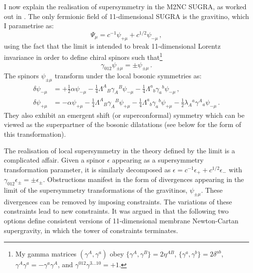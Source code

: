 \documentclass[11pt]{article}
\newcommand{\be}{\begin{equation}}
\newcommand{\ee}{\end{equation}}
\numberwithin{equation}{section}
\begin{document}
{{I now explain the realisation of supersymmetry in the M2NC SUGRA, as worked out in \cite{Bergshoeff:2024nin}.
The only fermionic field of 11-dimensional SUGRA is the gravitino, which I parametrise as:
\be
\Psi_\mu = c^{-1} \psi_{+\mu} + c^{1/2} \psi_{-\mu} \,, 
\label{ExpFer}
\ee
using the fact that the limit is intended to break 11-dimensional Lorentz invariance in order to define chiral spinors such that\footnote{My gamma matrices $(\gamma^A, \gamma^a)$ obey $\{\gamma^A, \gamma^B\} = 2 \eta^{AB}$, $\{\gamma^a, \gamma^b\} = 2 \delta^{ab}$, $\gamma^A \gamma^a = - \gamma^a\gamma^A$, and $\gamma^{012} \gamma^{3\dots10} = +1$.}
\be
\gamma_{012} \psi_{\pm \mu} = \pm \psi_{\pm \mu} \,.
\ee
The spinors $\psi_{\pm \mu}$ transform under the local bosonic symmetries as:
\begin{subequations}
\begin{align}
\label{bosonictransf_ferminus}
\delta \psi_{-\mu}& = + \tfrac12 \alpha \psi_{-\mu}- \tfrac14 \Lambda^A{}_B \gamma_A{}^B \psi_{-\mu} - \tfrac14 \Lambda^a{}_b \gamma_a{}^b \psi_{-\mu}\,,\\
\delta \psi_{+\mu}& = - \alpha \psi_{+\mu} - \tfrac14 \Lambda^A{}_B \gamma_A{}^B \psi_{+\mu} - \tfrac14 \Lambda^a{}_b \gamma_a{}^b \psi_{+\mu}- \tfrac12 \lambda_A{}^a \gamma^A{}_a \psi_{-\mu}  \,.
\label{bosonictransf_ferplus}
\end{align}
\end{subequations}
They also exhibit an emergent shift (or superconformal) symmetry which can be viewed as the superpartner of the bosonic dilatations (see below for the form of this transformation).

The realisation of local supersymmetry in the theory defined by the limit is a complicated affair.
Given a spinor $\epsilon$ appearing as a supersymmetry transformation parameter, it is similarly decomposed as $\epsilon = c^{-1} \epsilon_+ + c^{1/2} \epsilon_-$ with $\gamma_{012} \epsilon_\pm = \pm \epsilon_\pm$. 
Obstructions manifest in the form of divergences appearing in the limit of the supersymmetry transformations of the gravitinos, $\psi_{\pm \mu}$.
These divergences can be removed by imposing constraints.
The variations of these constraints lead to new constraints. 
It was argued in \cite{Bergshoeff:2024nin} that the following two options define consistent versions of 11-dimensional membrane Newton-Cartan supergravity, in which the tower of constraints terminates.

}}
\end{document}

